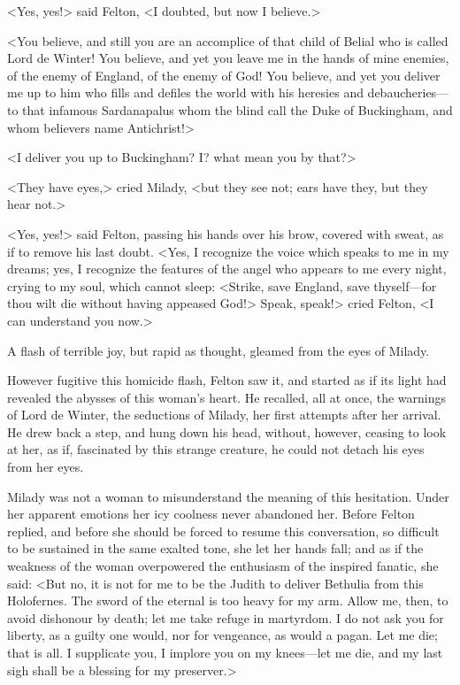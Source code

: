 <Yes, yes!> said Felton, <I doubted, but now I believe.> 

<You believe, and still you are an accomplice of that child of Belial who is called Lord de Winter! You believe, and yet you leave me in the hands of mine enemies, of the enemy of England, of the enemy of God! You believe, and yet you deliver me up to him who fills and defiles the world with his heresies and debaucheries—to that infamous Sardanapalus whom the blind call the Duke of Buckingham, and whom believers name Antichrist!> 

<I deliver you up to Buckingham? I? what mean you by that?> 

<They have eyes,> cried Milady, <but they see not; ears have they, but they hear not.> 

<Yes, yes!> said Felton, passing his hands over his brow, covered with sweat, as if to remove his last doubt. <Yes, I recognize the voice which speaks to me in my dreams; yes, I recognize the features of the angel who appears to me every night, crying to my soul, which cannot sleep: <Strike, save England, save thyself—for thou wilt die without having appeased God!> Speak, speak!> cried Felton, <I can understand you now.> 

A flash of terrible joy, but rapid as thought, gleamed from the eyes of Milady. 

However fugitive this homicide flash, Felton saw it, and started as if its light had revealed the abysses of this woman's heart. He recalled, all at once, the warnings of Lord de Winter, the seductions of Milady, her first attempts after her arrival. He drew back a step, and hung down his head, without, however, ceasing to look at her, as if, fascinated by this strange creature, he could not detach his eyes from her eyes. 

Milady was not a woman to misunderstand the meaning of this hesitation. Under her apparent emotions her icy coolness never abandoned her. Before Felton replied, and before she should be forced to resume this conversation, so difficult to be sustained in the same exalted tone, she let her hands fall; and as if the weakness of the woman overpowered the enthusiasm of the inspired fanatic, she said: <But no, it is not for me to be the Judith to deliver Bethulia from this Holofernes. The sword of the eternal is too heavy for my arm. Allow me, then, to avoid dishonour by death; let me take refuge in martyrdom. I do not ask you for liberty, as a guilty one would, nor for vengeance, as would a pagan. Let me die; that is all. I supplicate you, I implore you on my knees—let me die, and my last sigh shall be a blessing for my preserver.> 

